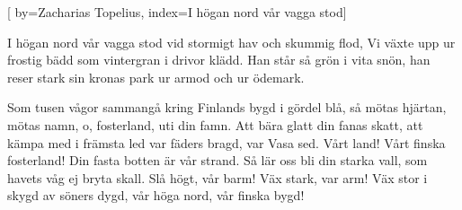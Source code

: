
[
  by={Zacharias Topelius},
  index={I högan nord vår vagga stod}]
  
\beginverse*
I högan nord vår vagga stod
vid stormigt hav och skummig flod,
Vi växte upp ur frostig bädd
som vintergran i drivor klädd.
Han står så grön
i vita snön,
han reser stark
sin kronas park
ur armod och ur ödemark.
\endverse

\beginverse*
Som tusen vågor sammangå
kring Finlands bygd i gördel blå,
så mötas hjärtan, mötas namn,
o, fosterland, uti din famn.
Att bära glatt
din fanas skatt,
att kämpa med
i främsta led
var fäders bragd, var Vasa sed.
\endverse
\newpage
\beginverse*
Vårt land! Vårt finska fosterland!
Din fasta botten är vår strand.
Så lär oss bli din starka vall,
som havets våg ej bryta skall.
Slå högt, vår barm!
Väx stark, var arm!
Väx stor i skygd
av söners dygd,
vår höga nord, vår finska bygd!
\endverse
\endsong